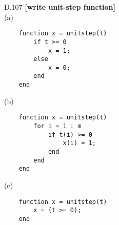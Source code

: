 \documentclass{article}
\begin{document}
\bigskip
D.107 {\bf [write unit-step function]}\\
(a)
\begin{lstlisting}
    function x = unitstep(t)
        if t >= 0
            x = 1;
        else
            x = 0;
        end
    end
\end{lstlisting}

(b)
\begin{lstlisting}
    function x = unitstep(t)
        for i = 1 : m
            if t(i) >= 0
                x(i) = 1;
            end
        end
    end
\end{lstlisting}

(c)
\begin{lstlisting}
    function x = unitstep(t)
        x = (t >= 0);
    end
\end{lstlisting}
\end{document}
